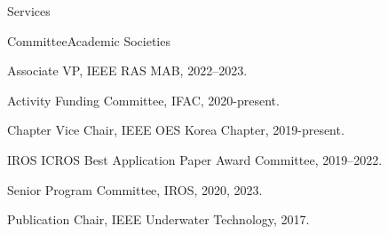 \begin{rSection}{Services}

\begin{rSubsection}{Committee}{}{Academic Societies}{}
  \item Associate VP, IEEE RAS MAB, 2022--2023.
  \item Activity Funding Committee, IFAC, 2020-present.
  \item Chapter Vice Chair, IEEE OES Korea Chapter, 2019-present.
  \item IROS ICROS Best Application Paper Award Committee, 2019--2022.



  \item Senior Program Committee, IROS, 2020, 2023.


  \item Publication Chair, IEEE Underwater Technology, 2017.

\end{rSubsection}


%
%


\end{rSection}

